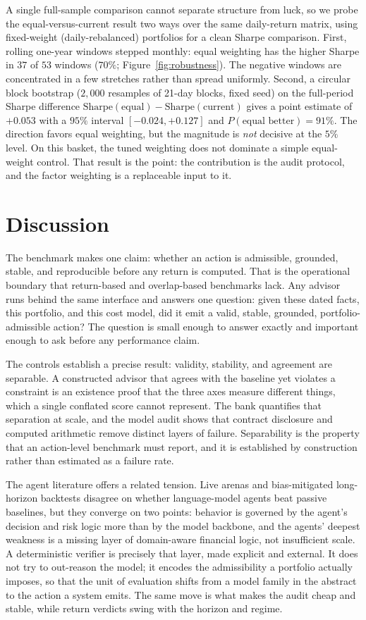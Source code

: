 \documentclass[sigconf,review,anonymous]{acmart}
\begin{document}
A single full-sample comparison cannot separate structure from luck, so we probe the equal-versus-current result two ways over the same daily-return matrix, using fixed-weight (daily-rebalanced) portfolios for a clean Sharpe comparison. First, rolling one-year windows stepped monthly: equal weighting has the higher Sharpe in $37$ of $53$ windows ($70\%$; Figure~\ref{fig:robustness}). The negative windows are concentrated in a few stretches rather than spread uniformly. Second, a circular block bootstrap ($2{,}000$ resamples of 21-day blocks, fixed seed) on the full-period Sharpe difference $\mathrm{Sharpe}(\text{equal})-\mathrm{Sharpe}(\text{current})$ gives a point estimate of $+0.053$ with a $95\%$ interval $[-0.024, +0.127]$ and $P(\text{equal better})=91\%$. The direction favors equal weighting, but the magnitude is \emph{not} decisive at the $5\%$ level. On this basket, the tuned weighting does not dominate a simple equal-weight control. That result is the point: the contribution is the audit protocol, and the factor weighting is a replaceable input to it.

\section{Discussion}

The benchmark makes one claim: whether an action is admissible, grounded, stable, and reproducible before any return is computed. That is the operational boundary that return-based and overlap-based benchmarks lack. Any advisor runs behind the same interface and answers one question: given these dated facts, this portfolio, and this cost model, did it emit a valid, stable, grounded, portfolio-admissible action? The question is small enough to answer exactly and important enough to ask before any performance claim.

The controls establish a precise result: validity, stability, and agreement are separable. A constructed advisor that agrees with the baseline yet violates a constraint is an existence proof that the three axes measure different things, which a single conflated score cannot represent. The bank quantifies that separation at scale, and the model audit shows that contract disclosure and computed arithmetic remove distinct layers of failure. Separability is the property that an action-level benchmark must report, and it is established by construction rather than estimated as a failure rate.

The agent literature offers a related tension. Live arenas and bias-mitigated long-horizon backtests disagree on whether language-model agents beat passive baselines, but they converge on two points: behavior is governed by the agent's decision and risk logic more than by the model backbone, and the agents' deepest weakness is a missing layer of domain-aware financial logic, not insufficient scale. A deterministic verifier is precisely that layer, made explicit and external. It does not try to out-reason the model; it encodes the admissibility a portfolio actually imposes, so that the unit of evaluation shifts from a model family in the abstract to the action a system emits. The same move is what makes the audit cheap and stable, while return verdicts swing with the horizon and regime.
\end{document}
